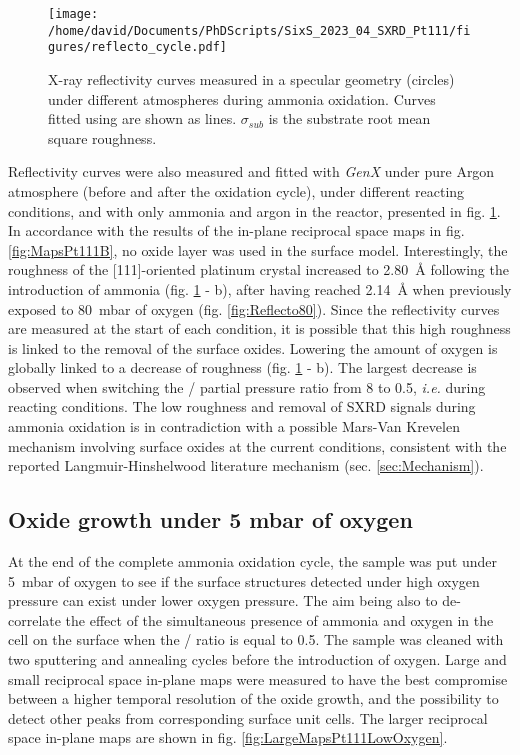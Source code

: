 \begin{figure}[!htb]
    \centering
    \texttt{[image: /home/david/Documents/PhDScripts/SixS\_2023\_04\_SXRD\_Pt111/figures/reflecto\_cycle.pdf]}
    \caption{
    	X-ray reflectivity curves measured in a specular geometry (circles) under different atmospheres during ammonia oxidation.
        Curves fitted using  are shown as lines.
        $\sigma_{sub}$ is the substrate root mean square roughness.
        }
    \label{fig:ReflectoCycle}
\end{figure}

Reflectivity curves were also measured and fitted with \textit{GenX} under pure Argon atmosphere (before and after the oxidation cycle), under different reacting conditions, and with only ammonia and argon in the reactor, presented in fig. \ref{fig:ReflectoCycle}.
In accordance with the results of the in-plane reciprocal space maps in fig. \ref{fig:MapsPt111B}, no oxide layer was used in the surface model.
Interestingly, the roughness of the [111]-oriented platinum crystal increased to \qty{2.80}{\angstrom} following the introduction of ammonia (fig. \ref{fig:ReflectoCycle} - b), after having reached \qty{2.14}{\angstrom} when previously exposed to \qty{80}{\milli\bar} of oxygen (fig. \ref{fig:Reflecto80}).
Since the reflectivity curves are measured at the start of each condition, it is possible that this high roughness is linked to the removal of the surface oxides.
Lowering the amount of oxygen is globally linked to a decrease of roughness (fig. \ref{fig:ReflectoCycle} - b).
The largest decrease is observed when switching the / partial pressure ratio from 8 to 0.5, \textit{i.e.} during reacting conditions.
The low roughness and removal of SXRD signals during ammonia oxidation is in contradiction with a possible Mars-Van Krevelen mechanism involving surface oxides at the current conditions, consistent with the reported Langmuir-Hinshelwood literature mechanism (sec. \ref{sec:Mechanism}).

\subsection{Oxide growth under 5 mbar of oxygen}

At the end of the complete ammonia oxidation cycle, the sample was put under \qty{5}{\milli\bar} of oxygen to see if the surface structures detected under high oxygen pressure can exist under lower oxygen pressure.
The aim being also to de-correlate the effect of the simultaneous presence of ammonia and oxygen in the cell on the surface when the / ratio is equal to \num{0.5}.
The sample was cleaned with two sputtering and annealing cycles before the introduction of oxygen.
Large and small reciprocal space in-plane maps were measured to have the best compromise between a higher temporal resolution of the oxide growth, and the possibility to detect other peaks from corresponding surface unit cells.
The larger reciprocal space in-plane maps are shown in fig. \ref{fig:LargeMapsPt111LowOxygen}.

